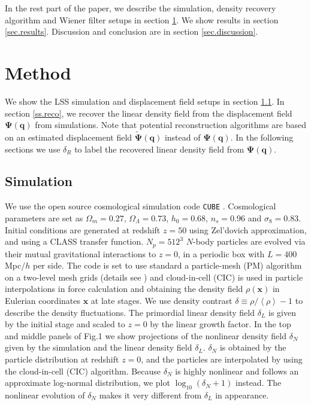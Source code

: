 \documentclass[aps,prd,twocolumn,superscriptaddress,amsfont,amssymb,amsmath,nofootinbib,showpacs,balancelastpage]{revtex4-1}
\newcommand{\bs}{\boldsymbol}
\newcommand{\lb}{\left\langle}
\newcommand{\rb}{\right\rangle}
\begin{document}
In the rest part of the paper, we describe the simulation,
density recovery algorithm and Wiener filter setups in section
\ref{sec.method}. We show results in section \ref{sec.results}.
Discussion and conclusion are in section \ref{sec.discussion}.


\section{Method}\label{sec.method}
We show the LSS simulation and displacement field setups in section \ref{ss.sim}.
In section \ref{ss.reco}, we recover the linear density field from the
displacement field $\bs\Psi(\bs q)$ from simulations.
Note that potential reconstruction algorithms are
based on an estimated displacement field $\tilde{\bs \Psi}(\bs q)$
instead of $\bs\Psi(\bs q)$. In the following sections we
use $\delta_R$ to label the recovered linear density field
from $\bs\Psi(\bs q)$.

\subsection{Simulation}\label{ss.sim}
We use the open source cosmological simulation code {\tt CUBE} %
\citep{cafcube}.
Cosmological parameters are set as
$\Omega_m=0.27$, $\Omega_\Lambda=0.73$, $h_0=0.68$, $n_s=0.96$ and $\sigma_8=0.83$.
Initial conditions are generated at redshift $z=50$ 
using Zel'dovich approximation, and using a CLASS transfer function.
$N_p=512^3$ $N$-body particles are evolved via 
their mutual gravitational interactions to $z=0$, in a periodic box with $L=400$ 
Mpc$/h$ per side. The code is set to use standard a particle-mesh (PM) algorithm 
\cite{1988csup.book.....H} on a two-level mesh grids
(details see \cite{2013MNRAS.436..540H}) and cloud-in-cell
(CIC) is used in particle interpolations in force 
calculation and obtaining the density field $\rho({\bs x})$ in Eulerian coordinates 
${\bs x}$ at late stages. We use density contrast $\delta\equiv\rho/\lb\rho\rb-1$ 
to describe the density fluctuations. The primordial linear density field $
\delta_L$ is given by the initial stage and scaled to $z=0$ by the linear growth 
factor. In the top and middle panels of Fig.1 we show projections of the nonlinear density field
$\delta_N$ given by the simulation and the linear density field $\delta_L$.
$\delta_N$ is obtained by the particle distribution at redshift $z=0$, and
the particles are interpolated by using the cloud-in-cell (CIC) algorithm.
Because $\delta_N$ is highly nonlinear and follows an approximate
log-normal distribution, we plot $\log_{10}(\delta_N+1)$ instead.
The nonlinear evolution of $\delta_N$ makes it very different from $\delta_L$
in appearance.
\end{document}
